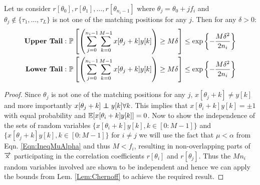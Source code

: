 \begin{lemma}
Let us consider $r[\theta_0],r[\theta_1],\ldots ,r[\theta_{n_i-1}]$ where $\theta_j=\theta_0+jf_i$ and $\theta_j \notin \{\tau_1,\ldots, \tau_L\}$ is not one of the matching positions for any $j$. Then for any $\delta>0$:
\begin{align*}
\text{\textbf{Upper Tail}}: ~&\mathbb{P}\left[ \left(\sum\limits_{j=0}^{n_i-1}\sum\limits_{k=0}^{M-1}x[\theta_j+k]y[k]\right)\geq M\delta\right]\leq \exp\left\lbrace-\frac{M\delta^2}{2n_i}\right\rbrace\\
\text{\textbf{Lower Tail}}: ~&\mathbb{P}\left[ \left(\sum\limits_{j=0}^{n_i-1}\sum\limits_{k=0}^{M-1}x[\theta_j+k]y[k]\right)\geq M\delta\right]\leq \exp\left\lbrace-\frac{M\delta^2}{2n_i}\right\rbrace\\
\end{align*}
\end{lemma}
\begin{proof}
Since $\theta_j$ is not one of the matching positions for any $j$, $x[\theta_j+k]\neq y[k]$ and more importantly $x[\theta_j+k]\indep y[k] \forall k$. This implies that $x[\theta_i+k]y[k]=\pm 1$ with equal probability and $\mathbb{E}[x[\theta_i+k]y[k]]=0$. Now to show the independence of the sets of random variables $\{x[\theta_i+k]y[k],k\in[0:M-1]\}$ and $\{x[\theta_j+k]y[k],k\in[0:M-1]\}$ for $i\neq j$ we will use the fact that $\mu<\alpha$  from Eqn. \eqref{Eqn:IneqMuAlpha} and thus $M<f_i$, resulting in non-overlapping parts of $\overrightarrow{\mathrm{x}}$  participating in the correlation coefficients $r[\theta_i]$ and $r[\theta_j]$. Thus the $Mn_i$ random variables involved are shown to be independent and hence we can apply the bounds from Lem. \ref{Lem:Chernoff} to achieve the required result.
\end{proof}


